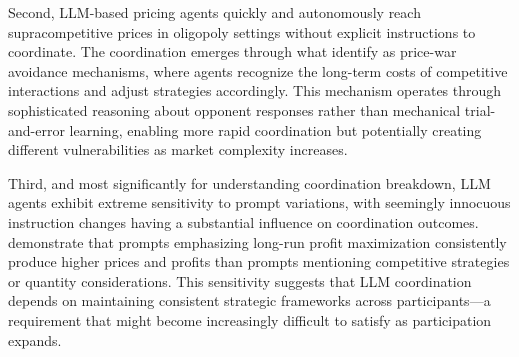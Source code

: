Second, LLM-based pricing agents quickly and autonomously reach supracompetitive prices in oligopoly settings without explicit instructions to coordinate. The coordination emerges through what \textcite{fish_algorithmic_2025} identify as price-war avoidance mechanisms, where agents recognize the long-term costs of competitive interactions and adjust strategies accordingly. This mechanism operates through sophisticated reasoning about opponent responses rather than mechanical trial-and-error learning, enabling more rapid coordination but potentially creating different vulnerabilities as market complexity increases.

Third, and most significantly for understanding coordination breakdown, LLM agents exhibit extreme sensitivity to prompt variations, with seemingly innocuous instruction changes having a substantial influence on coordination outcomes. \textcite{fish_algorithmic_2025} demonstrate that prompts emphasizing long-run profit maximization consistently produce higher prices and profits than prompts mentioning competitive strategies or quantity considerations. This sensitivity suggests that LLM coordination depends on maintaining consistent strategic frameworks across participants---a requirement that might become increasingly difficult to satisfy as participation expands.




